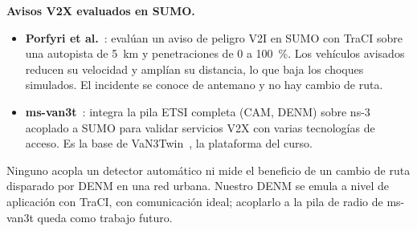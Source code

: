 \textbf{Avisos V2X evaluados en SUMO.}
\begin{itemize}
\item \textbf{Porfyri et al.}~\cite{porfyri2019rhw}: evalúan un aviso de peligro V2I en SUMO con TraCI sobre una autopista de 5~km y penetraciones de 0 a 100~\%. Los vehículos avisados reducen su velocidad y amplían su distancia, lo que baja los choques simulados. El incidente se conoce de antemano y no hay cambio de ruta.
\item \textbf{ms-van3t}~\cite{raviglione2024msvan3t}: integra la pila ETSI completa (CAM, DENM) sobre ns-3 acoplado a SUMO para validar servicios V2X con varias tecnologías de acceso. Es la base de VaN3Twin~\cite{pegurri2026van3twin}, la plataforma del curso.
\end{itemize}
Ninguno acopla un detector automático ni mide el beneficio de un cambio de ruta disparado por DENM en una red urbana. Nuestro DENM se emula a nivel de aplicación con TraCI, con comunicación ideal; acoplarlo a la pila de radio de ms-van3t queda como trabajo futuro.

